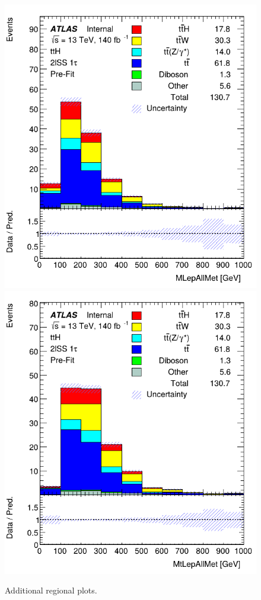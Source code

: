 \begin{figure}[ht!]
    \includegraphics[scale=0.25]{res/AnalysisPlots/mlep-all-met.png}
    \includegraphics[scale=0.25]{res/AnalysisPlots/mtlep-all-met.png}

    \caption{Additional regional plots.}
    \label{additionalValidationPlots}
\end{figure}
